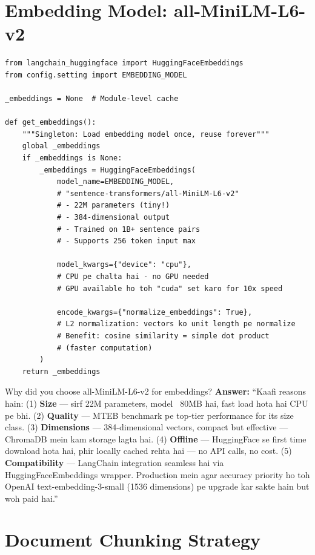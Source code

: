 \documentclass[11pt,a4paper,twoside]{report}
\begin{document}
\section{Embedding Model: all-MiniLM-L6-v2}

\begin{lstlisting}[style=pythonstyle,caption={vector\_store.py --- Embedding Model Setup}]
from langchain_huggingface import HuggingFaceEmbeddings
from config.setting import EMBEDDING_MODEL

_embeddings = None  # Module-level cache

def get_embeddings():
    """Singleton: Load embedding model once, reuse forever"""
    global _embeddings
    if _embeddings is None:
        _embeddings = HuggingFaceEmbeddings(
            model_name=EMBEDDING_MODEL,
            # "sentence-transformers/all-MiniLM-L6-v2"
            # - 22M parameters (tiny!)
            # - 384-dimensional output
            # - Trained on 1B+ sentence pairs
            # - Supports 256 token input max

            model_kwargs={"device": "cpu"},
            # CPU pe chalta hai - no GPU needed
            # GPU available ho toh "cuda" set karo for 10x speed

            encode_kwargs={"normalize_embeddings": True},
            # L2 normalization: vectors ko unit length pe normalize
            # Benefit: cosine similarity = simple dot product
            # (faster computation)
        )
    return _embeddings
\end{lstlisting}

\begin{interviewbox}{Why did you choose all-MiniLM-L6-v2 for embeddings?}
\textbf{Answer:} ``Kaafi reasons hain: (1) \textbf{Size} --- sirf 22M parameters, model ~80MB hai, fast load hota hai CPU pe bhi. (2) \textbf{Quality} --- MTEB benchmark pe top-tier performance for its size class. (3) \textbf{Dimensions} --- 384-dimensional vectors, compact but effective --- ChromaDB mein kam storage lagta hai. (4) \textbf{Offline} --- HuggingFace se first time download hota hai, phir locally cached rehta hai --- no API calls, no cost. (5) \textbf{Compatibility} --- LangChain integration seamless hai via HuggingFaceEmbeddings wrapper. Production mein agar accuracy priority ho toh OpenAI text-embedding-3-small (1536 dimensions) pe upgrade kar sakte hain but woh paid hai.''
\end{interviewbox}

\section{Document Chunking Strategy}
\end{document}
